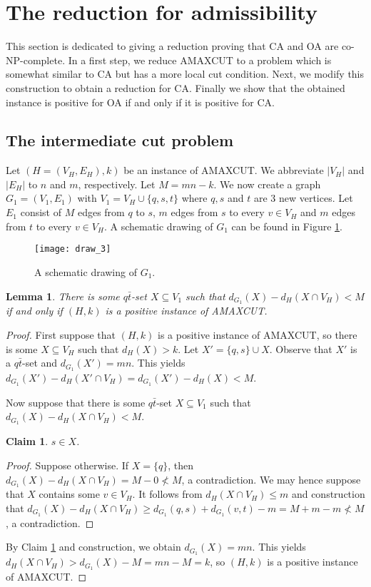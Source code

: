 \documentclass[a4paper,12pt,makeidx]{article}
\newtheorem{claim}{Claim}
\newtheorem{lemma}{Lemma}
\begin{document}
\section{The reduction for admissibility}\label{red}

This section is dedicated to giving a reduction proving that CA and OA are co-NP-complete. In a first step, we reduce AMAXCUT to a problem which is somewhat similar to CA but has a more local cut condition. Next, we modify this construction to obtain a reduction for CA. Finally we show that the obtained instance is positive for OA if and only if it is positive for CA.
\subsection{The intermediate cut problem}
Let $(H=(V_H,E_H),k)$ be an instance of AMAXCUT. We abbreviate $|V_H|$ and $|E_H|$ to $n$ and $m$, respectively. Let $M=mn-k$. We now create a graph  $G_1=(V_1,E_1)$ with $V_1=V_H \cup \{q,s,t\}$ where  $q,s$ and $t$ are 3 new vertices. Let $E_1$ consist of $M$ edges from $q$ to $s$, $m$ edges from $s$ to every $v \in V_H$ and  $m$ edges from $t$ to every $v \in V_H$. A schematic drawing of $G_1$ can be found in Figure \ref{draw3}.

 \begin{figure}[h]
        \centerline{\texttt{[image: draw\_3]}}
        \caption{A schematic drawing of $G_1$.}\label{draw3}
    \end{figure}
\begin{lemma}\label{int}
There is some $q\bar{t}$-set $X\subseteq V_1$ such that $d_{G_1}(X)-d_H(X\cap V_H)<M$ if and only if $(H,k)$ is a positive instance of AMAXCUT.
\end{lemma}
\begin{proof}
First suppose that $(H,k)$ is a positive instance of AMAXCUT, so there is some $X \subseteq V_H$ such that $d_H(X)>k$. Let $X'=\{q,s\}\cup X$. Observe that $X'$ is a $q\bar{t}$-set and $d_{G_1}(X')=mn$. This yields $d_{G_1}(X')-d_H(X'\cap V_H)=d_{G_1}(X')-d_H(X)<M$.

Now suppose that there is some $q\bar{t}$-set $X\subseteq V_1$ such that $d_{G_1}(X)-d_H(X\cap V_H)<M$. 
\begin{claim}\label{strich}
$s \in X$.
\end{claim}
\begin{proof}
Suppose otherwise. If $X=\{q\}$, then $d_{G_1}(X)-d_H(X \cap V_H)=M-0\nless M$, a contradiction. We may hence suppose that $X$ contains some $v \in V_H$. It follows from $d_H(X\cap V_H)\leq m$ and construction that $d_{G_1}(X)-d_H(X \cap V_H)\geq d_{G_1}(q,s)+d_{G_1}(v,t)-m=M+m-m\nless M$, a contradiction.
\end{proof}
By Claim \ref{strich} and construction, we obtain $d_{G_1}(X)=mn$. This yields $d_H(X \cap V_H)>d_{G_1}(X)-M=mn-M=k$, so $(H,k)$ is a positive instance of AMAXCUT.
\end{proof}
\end{document}
